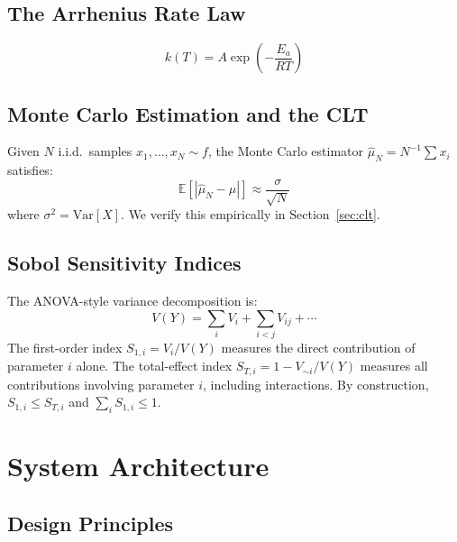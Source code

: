 \documentclass[12pt,a4paper]{article}
\theoremstyle{plain}
\theoremstyle{definition}
\theoremstyle{remark}
\begin{document}
\subsection{The Arrhenius Rate Law}

\begin{equation}
  k(T) = A \exp\!\left(-\frac{E_a}{RT}\right)
  \label{eq:arrhenius}
\end{equation}

\subsection{Monte Carlo Estimation and the CLT}

Given $N$ i.i.d.\ samples $x_1,\ldots,x_N \sim f$,
the Monte Carlo estimator $\hat\mu_N = N^{-1}\sum x_i$ satisfies:
\begin{equation}
  \mathbb{E}[|\hat\mu_N - \mu|] \approx \frac{\sigma}{\sqrt{N}}
  \label{eq:clt}
\end{equation}
where $\sigma^2 = \mathrm{Var}[X]$.
We verify this empirically in Section~\ref{sec:clt}.

\subsection{Sobol Sensitivity Indices}

The ANOVA-style variance decomposition is:
\begin{equation}
  V(Y) = \sum_i V_i + \sum_{i<j} V_{ij} + \cdots
\end{equation}
The first-order index $S_{1,i} = V_i / V(Y)$ measures the direct
contribution of parameter $i$ alone.
The total-effect index $S_{T,i} = 1 - V_{\sim i}/V(Y)$ measures all
contributions involving parameter $i$, including interactions.
By construction, $S_{1,i} \le S_{T,i}$ and $\sum_i S_{1,i} \le 1$.

\section{System Architecture}

\subsection{Design Principles}
\end{document}
